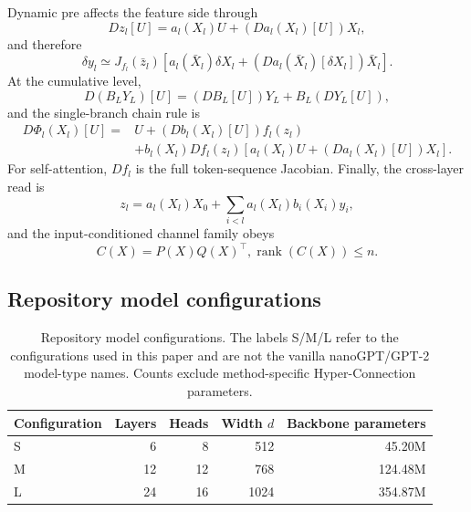 \documentclass{article}
\begin{document}
Dynamic pre affects the feature side through
\begin{equation}
 Dz_l[U]=a_l(X_l)U+(Da_l(X_l)[U])X_l,
 \label{eq:dynamic-read-differential}
\end{equation}
and therefore
\begin{equation}
 \delta y_l\simeq J_{f_l}(\bar z_l)\left[a_l(\bar X_l)\delta X_l+
 (Da_l(\bar X_l)[\delta X_l])\bar X_l\right].
 \label{eq:dynamic-pre-linearized}
\end{equation}
At the cumulative level,
\begin{equation}
 D\!\left(B_LY_L\right)[U]=\left(DB_L[U]\right)Y_L+B_L\left(DY_L[U]\right),
 \label{eq:dynamic-factor-differential}
\end{equation}
and the single-branch chain rule is
\begin{align}
 D\Phi_l(X_l)[U]
 ={}&U+(Db_l(X_l)[U])f_l(z_l) \\
 &+b_l(X_l)Df_l(z_l)\!\left[a_l(X_l)U+(Da_l(X_l)[U])X_l\right].
 \label{eq:dynamic-jacobian}
\end{align}
For self-attention, $Df_l$ is the full token-sequence Jacobian. Finally, the
cross-layer read is
\begin{equation}
 z_l=a_l(X_l)X_0+\sum_{i<l}a_l(X_l)b_i(X_i)y_i,
 \label{eq:dynamic-cross-layer}
\end{equation}
and the input-conditioned channel family obeys
\begin{equation}
 C(X)=P(X)Q(X)^\top,\operatorname{rank}(C(X))\le n.
 \label{eq:dynamic-channel-family}
\end{equation}

\subsection{Repository model configurations}
\label{app:model-config}
\begin{table}[H]
\caption{Repository model configurations. The labels S/M/L refer to the
configurations used in this paper and are not the vanilla nanoGPT/GPT-2
model-type names. Counts exclude method-specific Hyper-Connection parameters.}
\label{tab:model-config}
\begin{center}
\small
\begin{tabular}{lrrrr}
\toprule
Configuration & Layers & Heads & Width $d$ & Backbone parameters \\
\midrule
S & 6 & 8 & 512 & 45.20M \\
M & 12 & 12 & 768 & 124.48M \\
L & 24 & 16 & 1024 & 354.87M \\
\bottomrule
\end{tabular}
\end{center}
\end{table}
\end{document}
